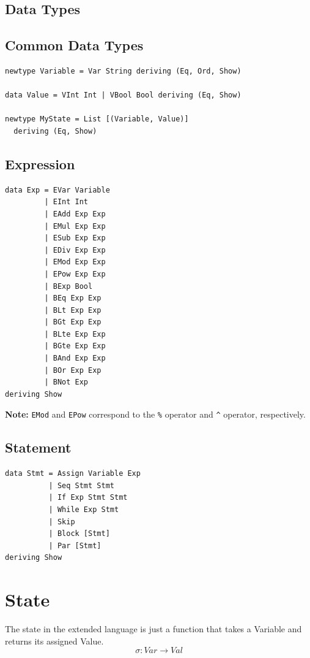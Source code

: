 \documentclass{article}
\begin{document}
	
	\subsection{Data Types}
	\subsection*{Common Data Types}
	
	\begin{lstlisting}
newtype Variable = Var String deriving (Eq, Ord, Show)
		
data Value = VInt Int | VBool Bool deriving (Eq, Show)
		
newtype MyState = List [(Variable, Value)] 
  deriving (Eq, Show)
	\end{lstlisting}
	
	\subsection*{Expression}
	\begin{lstlisting}
data Exp = EVar Variable
    	 | EInt Int
    	 | EAdd Exp Exp
    	 | EMul Exp Exp
    	 | ESub Exp Exp
    	 | EDiv Exp Exp
    	 | EMod Exp Exp
    	 | EPow Exp Exp
    	 | BExp Bool
    	 | BEq Exp Exp
    	 | BLt Exp Exp
    	 | BGt Exp Exp
    	 | BLte Exp Exp
    	 | BGte Exp Exp
    	 | BAnd Exp Exp
    	 | BOr Exp Exp
    	 | BNot Exp
deriving Show
	\end{lstlisting}
	
	\textbf{Note:} \texttt{EMod} and \texttt{EPow} correspond to the \texttt{\%} operator and \texttt{\^{}} operator, respectively.
	
	\subsection*{Statement}
	\begin{lstlisting}
data Stmt = Assign Variable Exp 
          | Seq Stmt Stmt 
          | If Exp Stmt Stmt 
          | While Exp Stmt
          | Skip
          | Block [Stmt]
          | Par [Stmt]
deriving Show
	\end{lstlisting}
	
	\section{State}
	The state in the extended language is just a function that takes a Variable and returns its assigned Value.
	\[
	\sigma : Var \rightarrow Val
	\]
	
\end{document}
